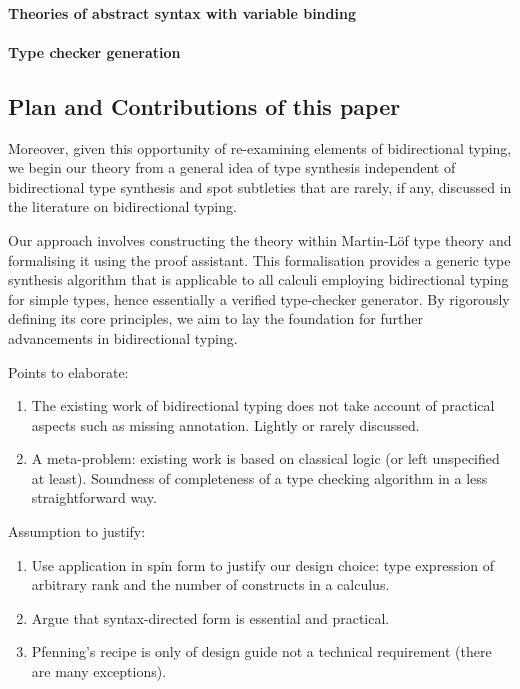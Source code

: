 \paragraph{Theories of abstract syntax with variable binding}
\cite{Fiore1999,Hirschowitz2010,Ahrens2018,Fiore2022,Ahrens2021,Arkor2020,Hirschowitz2022}
\cite{Fiore2013,Hamana2011,Hamana2022}


\paragraph{Type checker generation}
\cite{Gast2004,Grewe2015,Pacak2020,Cimini2020}

\subsection{Plan and Contributions of this paper}

Moreover, given this opportunity of re-examining elements of bidirectional typing, we begin our theory from a general idea of type synthesis independent of bidirectional type synthesis and spot subtleties that are rarely, if any, discussed in the literature on bidirectional typing. 

Our approach involves constructing the theory within Martin-L\"of type theory and formalising it using the \Agda proof assistant.
This formalisation provides a generic type synthesis algorithm that is applicable to all calculi employing bidirectional typing for simple types, hence essentially a verified type-checker generator.
By rigorously defining its core principles, we aim to lay the foundation for further advancements in bidirectional typing.



Points to elaborate:
\begin{enumerate}
  \item The existing work of bidirectional typing does not take account of practical aspects such as missing annotation.
    Lightly or rarely discussed.
  \item A meta-problem: existing work is based on classical logic (or left unspecified at least).
    Soundness of completeness of a type checking algorithm in a less straightforward way.
\end{enumerate}
Assumption to justify:
\begin{enumerate}
  \item Use application in spin form to justify our design choice: type expression of arbitrary rank and the number of constructs in a calculus.
  \item Argue that syntax-directed form is essential and practical.
  \item Pfenning's recipe is only of design guide not a technical requirement (there are many exceptions).
\end{enumerate}

